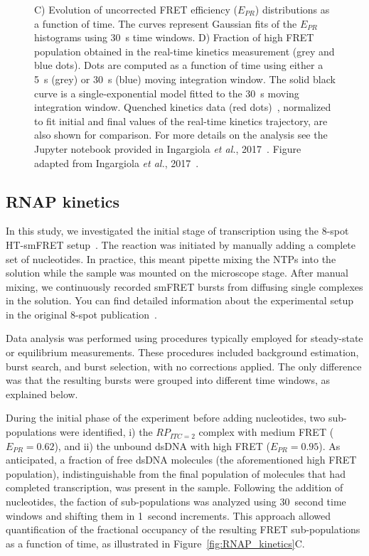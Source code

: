 \begin{figure}
{C) Evolution of uncorrected FRET efficiency ($E_{PR}$) distributions as a function of time.
The curves represent Gaussian fits of the $E_{PR}$ histograms using 30~s time windows.
D) Fraction of high FRET population obtained in the real-time kinetics measurement (grey and blue dots).
Dots are computed as a function of time using either a 5~s (grey) or 30~s (blue) moving integration window.
The solid black curve is a single-exponential model fitted to the 30~s moving integration window.
Quenched kinetics data (red dots)~\cite{lerner_PNAS_2016}, normalized to fit initial and final values of
the real-time kinetics trajectory, are also shown for comparison.
For more details on the analysis see the Jupyter notebook provided in Ingargiola \textit{et al.}, 2017~\cite{ingargiola_PLOS1_2016}.
Figure adapted from Ingargiola \textit{et al.}, 2017~\cite{ingargiola_PLOS1_2016}.
}
\end{figure}

\subsection{RNAP kinetics}
\label{sec:kinetics_analysis}

In this study, we investigated the initial stage of transcription using the 8-spot \ac{HT-smFRET} setup~\cite{ingargiola_PLOS1_2016}. 
The reaction was initiated by manually adding a complete set of nucleotides. 
In practice, this meant pipette mixing the \ac{NTP}s into the solution while the sample was mounted on the microscope stage. 
After manual mixing, we continuously recorded smFRET bursts from diffusing single complexes in the solution. 
You can find detailed information about the experimental setup in the original 8-spot publication~\cite{ingargiola_PLOS1_2016}.

Data analysis was performed using procedures typically employed for steady-state or equilibrium measurements. 
These procedures included background estimation, burst search, and burst selection, with no corrections applied. 
The only difference was that the resulting bursts were grouped into different time windows, as explained below.

During the initial phase of the experiment before adding nucleotides, two sub-populations were identified, i) the $RP_{ITC=2}$ complex with medium FRET ($E_{PR} = 0.62$), and ii) the unbound \ac{dsDNA} with high FRET ($E_{PR} = 0.95$).
As anticipated, a fraction of free \ac{dsDNA} molecules (the aforementioned high FRET population), indistinguishable from the final population of molecules that had completed transcription, was present in the sample.
Following the addition of nucleotides, the faction of sub-populations was analyzed using 30~second time windows and shifting them in 1~second increments. 
This approach allowed quantification of the fractional occupancy of the resulting FRET sub-populations as a function of time, as illustrated in Figure~\ref{fig:RNAP_kinetics}C.

